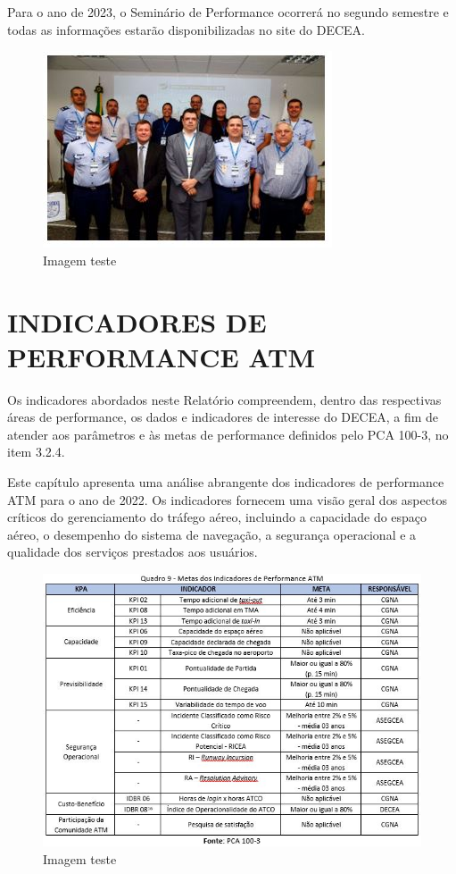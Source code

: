 \documentclass[
]{book}
\begin{document}
Para o ano de 2023, o Seminário de Performance ocorrerá no segundo semestre e todas as informações estarão disponibilizadas no site do DECEA.

\begin{figure}
\centering
\includegraphics{imagens/fig38.jpg}
\caption{Imagem teste}
\end{figure}

\hypertarget{indicadores-de-performance-atm}{%
\section{INDICADORES DE PERFORMANCE ATM}\label{indicadores-de-performance-atm}}

Os indicadores abordados neste Relatório compreendem, dentro das respectivas áreas de performance, os dados e indicadores de interesse do DECEA, a fim de atender aos parâmetros e às metas de performance definidos pelo PCA 100-3, no item 3.2.4.

Este capítulo apresenta uma análise abrangente dos indicadores de performance ATM para o ano de 2022. Os indicadores fornecem uma visão geral dos aspectos críticos do gerenciamento do tráfego aéreo, incluindo a capacidade do espaço aéreo, o desempenho do sistema de navegação, a segurança operacional e a qualidade dos serviços prestados aos usuários.

\begin{figure}
\centering
\includegraphics{imagens/fig39.jpg}
\caption{Imagem teste}
\end{figure}
\end{document}
